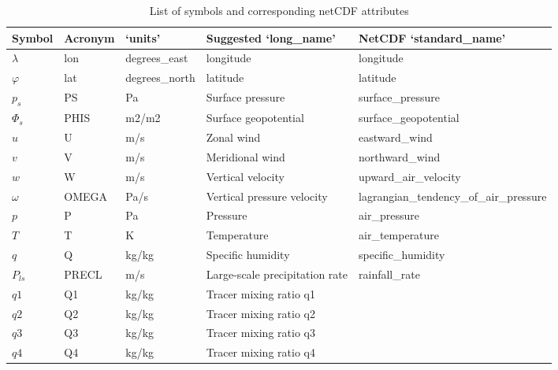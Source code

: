 \documentclass[times,doublespace]{fldauth}
\begin{document}
{\begin{appendix}
\begin{table}[h]
\caption{List of symbols and corresponding netCDF attributes} \label{tab:netcdf}
\begin{tabular*}{\textwidth}{@{\extracolsep{\fill}}lllll}
\hline Symbol & Acronym & `units' & Suggested `long\_name'  & NetCDF `standard\_name' \\ \hline 
$\lambda$ & lon & degrees\_east & longitude & longitude \\
$\varphi$ & lat & degrees\_north & latitude & latitude \\
$p_s$ & PS & Pa & Surface pressure & surface\_pressure\\
$\Phi_s$ & PHIS & m2/m2 &  Surface geopotential & surface\_geopotential\\
$u$ & U & m/s &  Zonal wind & eastward\_wind \\
$v$ & V & m/s & Meridional wind & northward\_wind\\
$w$ & W & m/s & Vertical velocity & upward\_air\_velocity\\
$\omega$ & OMEGA & Pa/s & Vertical pressure velocity & lagrangian\_tendency\_of\_air\_pressure \\
$p$ & P & Pa & Pressure & air\_pressure\\
$T$ & T & K & Temperature & air\_temperature\\
$q$ & Q & kg/kg & Specific humidity & specific\_humidity\\
$P_{ls}$ & PRECL & m/s & Large-scale precipitation rate & rainfall\_rate\\
$q1$ & Q1 & kg/kg & Tracer mixing ratio q1 & \\
$q2$ & Q2 & kg/kg & Tracer mixing ratio q2 & \\
$q3$ & Q3 & kg/kg & Tracer mixing ratio q3 & \\
$q4$ & Q4 & kg/kg & Tracer mixing ratio q4 & \\
\hline 
\end{tabular*}
\end{table}


\end{appendix}}
\end{document}

